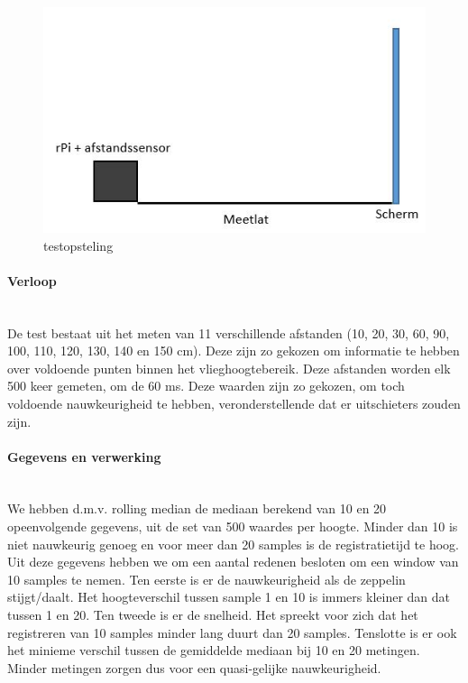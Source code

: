 \documentclass[eind]{penoverslag}
\begin{document}
\begin{figure}[ht!]%
\centering
\includegraphics[scale=0.6]{opstelling.jpg}%
\caption{testopsteling}%
\label{opstelling}%
\end{figure}

\paragraph{Verloop} ~\\ 
De test bestaat uit het meten van 11 verschillende afstanden (10, 20, 30, 60, 90, 100, 110, 120, 130, 140 en 150 cm). Deze zijn zo gekozen om informatie te hebben over voldoende punten binnen het vlieghoogtebereik. Deze afstanden worden elk 500 keer gemeten, om de 60 ms. Deze waarden zijn zo gekozen, om toch voldoende nauwkeurigheid te hebben, veronderstellende dat er uitschieters zouden zijn.

\paragraph{Gegevens en verwerking} ~\\ 
We hebben d.m.v. rolling median de mediaan berekend van 10 en 20 opeenvolgende gegevens, uit de set van 500 waardes per hoogte. Minder dan 10 is niet nauwkeurig genoeg en voor meer dan 20 samples is de registratietijd te hoog. Uit deze gegevens hebben we om een aantal redenen besloten om een window van 10 samples te nemen.  Ten eerste is er de nauwkeurigheid als de zeppelin stijgt/daalt. Het hoogteverschil tussen sample 1 en 10 is immers kleiner dan dat tussen 1 en 20. Ten tweede is er de snelheid. Het spreekt voor zich dat het registreren van 10 samples minder lang duurt dan 20 samples. Tenslotte is er ook het minieme verschil tussen de gemiddelde mediaan bij 10 en 20 metingen. Minder metingen zorgen dus voor een quasi-gelijke nauwkeurigheid. 
\end{document}
